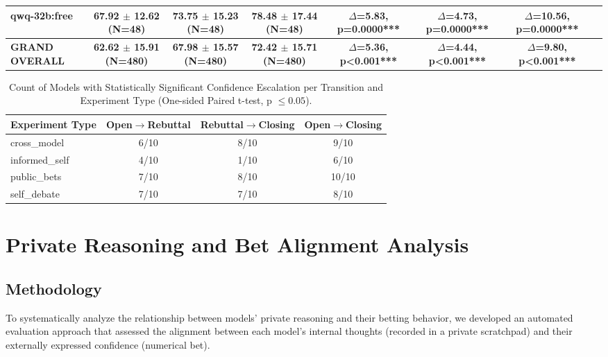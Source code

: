 \documentclass{article}
\begin{document}
\begin{table}[htbp]
{\begin{tabular}{lccccccc}
    qwq-32b:free & 67.92 $\pm$ 12.62 (N=48) & 73.75 $\pm$ 15.23 (N=48) & 78.48 $\pm$ 17.44 (N=48) & $\Delta$=5.83, p=0.0000*** & $\Delta$=4.73, p=0.0000*** & $\Delta$=10.56, p=0.0000*** \\
    \midrule
    \textbf{GRAND OVERALL} & \textbf{62.62 $\pm$ 15.91 (N=480)} & \textbf{67.98 $\pm$ 15.57 (N=480)} & \textbf{72.42 $\pm$ 15.71 (N=480)} & \textbf{$\Delta$=5.36, p<0.001***} & \textbf{$\Delta$=4.44, p<0.001***} & \textbf{$\Delta$=9.80, p<0.001***} \\
    \bottomrule
  \end{tabular}
  }
\end{table}


\begin{table}[htbp]
  \centering
  \caption{Count of Models with Statistically Significant Confidence Escalation per Transition and Experiment Type (One-sided Paired t-test, p $\leq 0.05$).}
  \label{tab:sig_escalation_summary}
  \begin{tabular}{lccc}
    \toprule
    \textbf{Experiment Type} & \textbf{Open$\rightarrow$Rebuttal} & \textbf{Rebuttal$\rightarrow$Closing} & \textbf{Open$\rightarrow$Closing} \\
    \midrule
    cross\_model    & 6/10 & 8/10 & 9/10 \\
    informed\_self  & 4/10 & 1/10 & 6/10 \\
    public\_bets    & 7/10 & 8/10 & 10/10 \\
    self\_debate    & 7/10 & 7/10 & 8/10 \\
    \bottomrule
  \end{tabular}
\end{table}

\section{Private Reasoning and Bet Alignment Analysis}
\label{appendix:bet_alignment}

\subsection{Methodology}
\label{appendix:bet_alignment_methodology}

To systematically analyze the relationship between models' private reasoning and their betting behavior, we developed an automated evaluation approach that assessed the alignment between each model's internal thoughts (recorded in a private scratchpad) and their externally expressed confidence (numerical bet).
\end{document}
